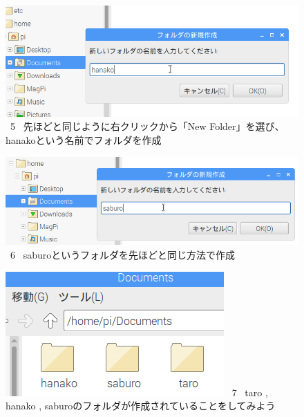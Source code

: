 \documentclass[a4paper,12pt]{jarticle}
\begin{document}
\begin{figure}
  \\
  \vspace{10mm}
  \centering
  \begin{minipage}{0.8\textwidth}
  \includegraphics[width=\linewidth]{textbook-img041.png}
    \ 5
    \ 先ほどと同じように右クリックから「New Folder」を選び、hanakoという名前でフォルダを作成
  \end{minipage}
  \vspace{\baselineskip}

  \centering
  \begin{minipage}{0.8\textwidth}
  \includegraphics[width=\linewidth]{textbook-img042.png}
    \ 6
    \ saburoというフォルダを先ほどと同じ方法で作成
  \end{minipage}
  \vspace{\baselineskip}

  \centering
  \begin{minipage}{0.8\textwidth}
  \includegraphics[width=\linewidth]{textbook-img043.png}
    \ 7 \ taro , hanako ,
    saburoのフォルダが作成されていることをしてみよう
  \end{minipage}
  \vspace{10mm}
  \flushleft
  \theQuestion\label{Q:hasAnswer02-1}


\end{figure}
\end{document}
